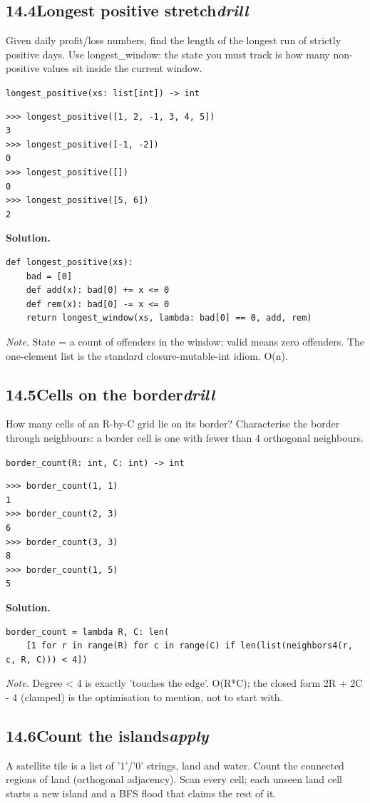 \documentclass[10pt,letterpaper]{book}
\begin{document}
\subsection*{14.4\quad Longest positive stretch\hfill\textnormal{\textit{drill}}}
Given daily profit/loss numbers, find the length of the longest run of strictly positive days. Use longest\_window: the state you must track is how many non-positive values sit inside the current window.

\noindent\texttt{longest\_positive(xs: list[int]) -> int}
\begin{lstlisting}[style=ex]
>>> longest_positive([1, 2, -1, 3, 4, 5])
3
>>> longest_positive([-1, -2])
0
>>> longest_positive([])
0
>>> longest_positive([5, 6])
2
\end{lstlisting}
\noindent\textbf{Solution.}
\begin{lstlisting}[style=code]
def longest_positive(xs):
    bad = [0]
    def add(x): bad[0] += x <= 0
    def rem(x): bad[0] -= x <= 0
    return longest_window(xs, lambda: bad[0] == 0, add, rem)
\end{lstlisting}
\noindent\textit{Note.} State = a count of offenders in the window; valid means zero offenders. The one-element list is the standard closure-mutable-int idiom. O(n).

\subsection*{14.5\quad Cells on the border\hfill\textnormal{\textit{drill}}}
How many cells of an R-by-C grid lie on its border? Characterise the border through neighbours: a border cell is one with fewer than 4 orthogonal neighbours.

\noindent\texttt{border\_count(R: int, C: int) -> int}
\begin{lstlisting}[style=ex]
>>> border_count(1, 1)
1
>>> border_count(2, 3)
6
>>> border_count(3, 3)
8
>>> border_count(1, 5)
5
\end{lstlisting}
\noindent\textbf{Solution.}
\begin{lstlisting}[style=code]
border_count = lambda R, C: len(
    [1 for r in range(R) for c in range(C) if len(list(neighbors4(r, c, R, C))) < 4])
\end{lstlisting}
\noindent\textit{Note.} Degree < 4 is exactly 'touches the edge'. O(R*C); the closed form 2R + 2C - 4 (clamped) is the optimisation to mention, not to start with.

\subsection*{14.6\quad Count the islands\hfill\textnormal{\textit{apply}}}
A satellite tile is a list of '1'/'0' strings, land and water. Count the connected regions of land (orthogonal adjacency). Scan every cell; each unseen land cell starts a new island and a BFS flood that claims the rest of it.
\end{document}
